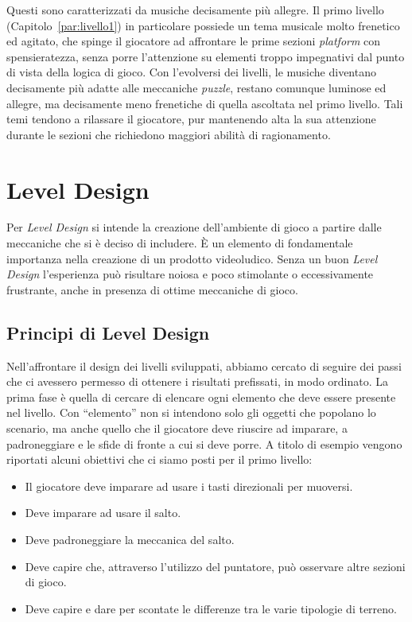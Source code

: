 Questi sono caratterizzati da musiche decisamente più allegre. Il primo livello (Capitolo~\ref{par:livello1}) in particolare possiede un tema musicale molto frenetico ed agitato, che spinge il giocatore ad affrontare le prime sezioni \textit{platform} con spensieratezza, senza porre l’attenzione su elementi troppo impegnativi dal punto di vista della logica di gioco.
Con l’evolversi dei livelli, le musiche diventano decisamente più adatte alle meccaniche \textit{puzzle}, restano comunque luminose ed allegre, ma decisamente meno frenetiche di quella ascoltata nel primo livello. Tali temi tendono a rilassare il giocatore, pur mantenendo alta la sua attenzione durante le sezioni che richiedono maggiori abilità di ragionamento.

\section{Level Design}
\label{sec:level_design}

Per \textit{Level Design} si intende la creazione dell’ambiente di gioco a partire dalle meccaniche che si è deciso di includere. È un elemento di fondamentale importanza nella creazione di un prodotto videoludico. Senza un buon \textit{Level Design} l’esperienza può risultare noiosa e poco stimolante o eccessivamente frustrante, anche in presenza di ottime meccaniche di gioco.

\subsection{Principi di Level Design}
\label{sec:principi_level_design}

Nell’affrontare il design dei livelli sviluppati, abbiamo cercato di seguire dei passi che ci avessero permesso di ottenere i risultati prefissati, in modo ordinato.
La prima fase è quella di cercare di elencare ogni elemento che deve essere presente nel livello. Con “elemento” non si intendono solo gli oggetti che popolano lo scenario, ma anche quello che il giocatore deve riuscire ad imparare, a padroneggiare e le sfide di fronte a cui si deve porre. A titolo di esempio vengono riportati alcuni obiettivi che ci siamo posti per il primo livello:

\begin{itemize}
	\item Il giocatore deve imparare ad usare i tasti direzionali per muoversi.
	\item Deve imparare ad usare il salto.
	\item Deve padroneggiare la meccanica del salto.
	\item Deve capire che, attraverso l’utilizzo del puntatore, può osservare altre sezioni di gioco.
	\item Deve capire e dare per scontate le differenze tra le varie tipologie di terreno.
\end{itemize}

